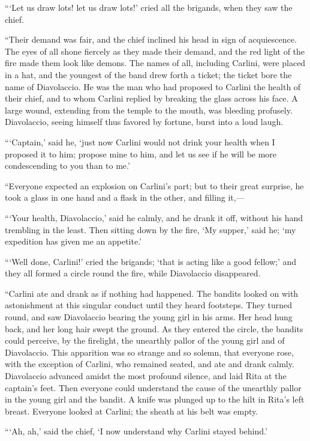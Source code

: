 “‘Let us draw lots! let us draw lots!’ cried all the brigands, when
they saw the chief.

“Their demand was fair, and the chief inclined his head in sign of
acquiescence. The eyes of all shone fiercely as they made their demand,
and the red light of the fire made them look like demons. The names of
all, including Carlini, were placed in a hat, and the youngest of the
band drew forth a ticket; the ticket bore the name of Diavolaccio. He
was the man who had proposed to Carlini the health of their chief, and
to whom Carlini replied by breaking the glass across his face. A large
wound, extending from the temple to the mouth, was bleeding profusely.
Diavolaccio, seeing himself thus favored by fortune, burst into a loud
laugh.

“‘Captain,’ said he, ‘just now Carlini would not drink your health when
I proposed it to him; propose mine to him, and let us see if he will be
more condescending to you than to me.’

“Everyone expected an explosion on Carlini’s part; but to their great
surprise, he took a glass in one hand and a flask in the other, and
filling it,—

“‘Your health, Diavolaccio,’ said he calmly, and he drank it off,
without his hand trembling in the least. Then sitting down by the fire,
‘My supper,’ said he; ‘my expedition has given me an appetite.’

“‘Well done, Carlini!’ cried the brigands; ‘that is acting like a good
fellow;’ and they all formed a circle round the fire, while Diavolaccio
disappeared.

“Carlini ate and drank as if nothing had happened. The bandits looked
on with astonishment at this singular conduct until they heard
footsteps. They turned round, and saw Diavolaccio bearing the young
girl in his arms. Her head hung back, and her long hair swept the
ground. As they entered the circle, the bandits could perceive, by the
firelight, the unearthly pallor of the young girl and of Diavolaccio.
This apparition was so strange and so solemn, that everyone rose, with
the exception of Carlini, who remained seated, and ate and drank
calmly. Diavolaccio advanced amidst the most profound silence, and laid
Rita at the captain’s feet. Then everyone could understand the cause of
the unearthly pallor in the young girl and the bandit. A knife was
plunged up to the hilt in Rita’s left breast. Everyone looked at
Carlini; the sheath at his belt was empty.

“‘Ah, ah,’ said the chief, ‘I now understand why Carlini stayed
behind.’

